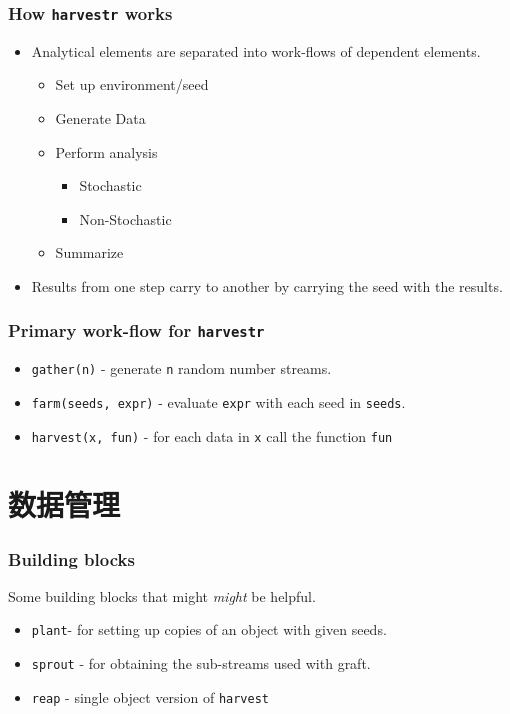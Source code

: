\documentclass[ignorenonframetext,]{beamer}
\begin{document}
\begin{frame}\frametitle{How \texttt{harvestr} works}

\begin{itemize}
\item
  Analytical elements are separated into work-flows of dependent
  elements.
  \begin{itemize}
  \item
    Set up environment/seed
  \item
    Generate Data
  \item
    Perform analysis
    \begin{itemize}
    \item
      Stochastic
    \item
      Non-Stochastic
    \end{itemize}
  \item
    Summarize
  \end{itemize}
\item
  Results from one step carry to another by carrying the seed with the
  results.
\end{itemize}
\end{frame}

\begin{frame}[fragile]\frametitle{\textbf{Primary work-flow} for
\texttt{harvestr}}

\begin{itemize}
\item
  \texttt{gather(n)} - generate \texttt{n} random number streams.
\item
  \texttt{farm(seeds, expr)} - evaluate \texttt{expr} with each seed in
  \texttt{seeds}.
\item
  \texttt{harvest(x, fun)} - for each data in \texttt{x} call the
  function \texttt{fun}
\end{itemize}
\end{frame}

\section{数据管理}

\begin{frame}[fragile]\frametitle{Building blocks}

Some building blocks that might \emph{might} be helpful.

\begin{itemize}
\item
  \texttt{plant}- for setting up copies of an object with given seeds.
\item
  \texttt{sprout} - for obtaining the sub-streams used with graft.
\item
  \texttt{reap} - single object version of \texttt{harvest}
\end{itemize}
\end{frame}
\end{document}
